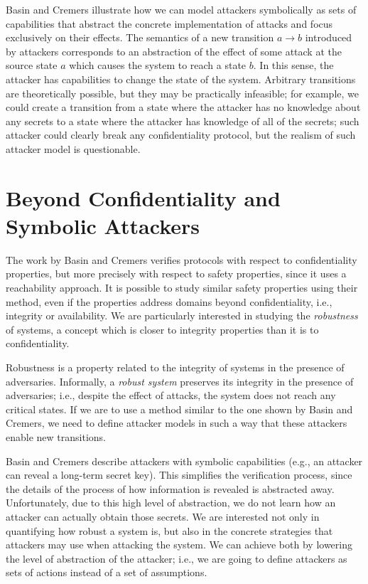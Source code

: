 Basin and Cremers illustrate how we can model attackers symbolically as sets of capabilities that abstract the concrete implementation of attacks and focus exclusively on their effects. The semantics of a new transition $a\rightarrow b$ introduced by attackers corresponds to an abstraction of the effect of some attack at the source state $a$ which causes the system to reach a state $b$. In this sense, the attacker has capabilities to change the state of the system. Arbitrary transitions are theoretically possible, but they may be practically infeasible; for example, we could create a transition from a state where the attacker has no knowledge about any secrets to a state where the attacker has knowledge of all of the secrets; such attacker could clearly break any confidentiality protocol, but the realism of such attacker model is questionable. 

\section{Beyond Confidentiality and Symbolic Attackers}
The work by Basin and Cremers verifies protocols with respect to confidentiality properties, but more precisely with respect to safety properties, since it uses a reachability approach. It is possible to study similar safety properties using their method, even if the properties address domains beyond confidentiality, i.e., integrity or availability. We are particularly interested in studying the \emph{robustness} of systems, a concept which is closer to integrity properties than it is to confidentiality.

Robustness is a property related to the integrity of systems in the presence of adversaries. Informally, a \emph{robust system} preserves its integrity in the presence of adversaries; i.e., despite the effect of attacks, the system does not reach any critical states. If we are to use a method similar to the one shown by Basin and Cremers, we need to define attacker models in such a way that these attackers enable new transitions. 

Basin and Cremers describe attackers with symbolic capabilities (e.g., an attacker can reveal a long-term secret key). This simplifies the verification process, since the details of the process of how information is revealed is abstracted away. Unfortunately, due to this high level of abstraction, we do not learn how an attacker can actually obtain those secrets. We are interested not only in quantifying how robust a system is, but also in the concrete strategies that attackers may use when attacking the system. We can achieve both by lowering the level of abstraction of the attacker; i.e., we are going to define attackers as sets of actions instead of a set of assumptions. %


